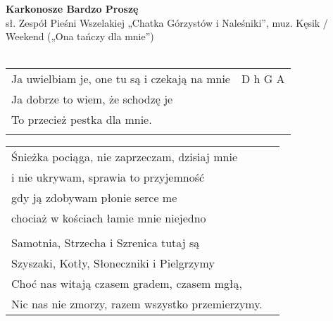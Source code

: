 \documentclass[a5paper]{article}
\begin{document}


\noindent
\fontsize{12pt}{15pt}\selectfont
\textbf{Karkonosze Bardzo Proszę} \\
\fontsize{8pt}{10pt}\selectfont
sł. Zespół Pieśni Wszelakiej „Chatka Górzystów i Naleśniki”, muz. Kęsik / Weekend („Ona tańczy dla mnie”) \\ \\
\fontsize{10pt}{12pt}\selectfont

\begin{tabular}{@{}p{7.50cm}p{3cm}@{}}
\noindent
Ja uwielbiam je, one tu są i czekają na mnie & D h G A \\
Ja dobrze to wiem, że schodzę je \\
To przecież pestka dla mnie. \\ \\
\end{tabular}

\noindent
\begin{tabular}{@{}p{8.50cm}p{3cm}@{}}
Śnieżka pociąga, nie zaprzeczam, dzisiaj mnie \\
i nie ukrywam, sprawia to przyjemność \\
gdy ją zdobywam płonie serce me \\
chociaż w kościach łamie mnie niejedno \\ \\

Samotnia, Strzecha i Szrenica tutaj są \\
Szyszaki, Kotły, Słoneczniki i Pielgrzymy \\
Choć nas witają czasem gradem, czasem mgłą, \\
Nic nas nie zmorzy, razem wszystko przemierzymy.
\end{tabular}
\end{document}
